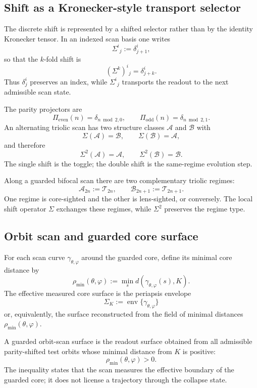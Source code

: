 \subsection{Shift as a Kronecker-style transport selector}
\label{subsec:shift-as-transport-selector}

The discrete shift is represented by a shifted selector rather than by the identity Kronecker tensor.  In an indexed scan basis one writes
\[
\Sigma^i{}_j := \delta^i_{j+1},
\]
so that the $k$-fold shift is
\[
(\Sigma^k)^i{}_j = \delta^i_{j+k}.
\]
Thus $\delta^i_j$ preserves an index, while $\Sigma^i{}_j$ transports the readout to the next admissible scan state.

The parity projectors are
\[
\Pi_{\mathrm{even}}(n)=\delta_{n\bmod 2,0},
\qquad
\Pi_{\mathrm{odd}}(n)=\delta_{n\bmod 2,1}.
\]
An alternating triolic scan has two structure classes $\mathcal A$ and $\mathcal B$ with
\[
\Sigma(\mathcal A)=\mathcal B,
\qquad
\Sigma(\mathcal B)=\mathcal A,
\]
and therefore
\[
\Sigma^2(\mathcal A)=\mathcal A,
\qquad
\Sigma^2(\mathcal B)=\mathcal B.
\]
The single shift is the toggle; the double shift is the same-regime evolution step.

\begin{assumption}
\label{ass:alternating-triolic-shift-hypothesis}
Along a guarded bifocal scan there are two complementary triolic regimes:
\[
\mathcal A_{2n}:=\mathcal T_{2n},
\qquad
\mathcal B_{2n+1}:=\mathcal T_{2n+1}.
\]
One regime is core-sighted and the other is lens-sighted, or conversely.  The local shift operator $\Sigma$ exchanges these regimes, while $\Sigma^2$ preserves the regime type.
\end{assumption}

\subsection{Orbit scan and guarded core surface}
\label{subsec:orbit-scan-guarded-core-surface}

For each scan curve $\gamma_{\theta,\varphi}$ around the guarded core, define its minimal core distance by
\[
\rho_{\min}(\theta,\varphi)
:=
\min_s d(\gamma_{\theta,\varphi}(s),K).
\]
The effective measured core surface is the periapsis envelope
\[
\Sigma_K
:=
\operatorname{env}\{\gamma_{\theta,\varphi}\}
\]
or, equivalently, the surface reconstructed from the field of minimal distances $\rho_{\min}(\theta,\varphi)$.

\begin{definition}
\label{def:guarded-orbit-scan-surface}
A guarded orbit-scan surface is the readout surface obtained from all admissible parity-shifted test orbits whose minimal distance from $K$ is positive:
\[
\rho_{\min}(\theta,\varphi)>0.
\]
The inequality states that the scan measures the effective boundary of the guarded core; it does not license a trajectory through the collapse state.
\end{definition}

